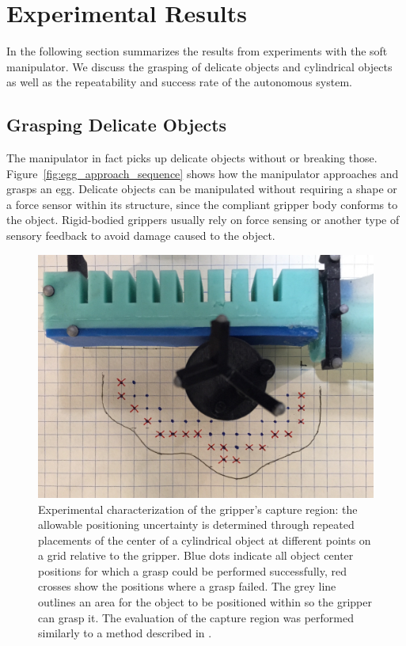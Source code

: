 \section{Experimental Results}
\label{sec:experimental_results}
In the following section summarizes the results from experiments with the soft manipulator. We discuss the grasping of delicate objects and cylindrical objects as well as the repeatability and success rate of the autonomous system.
 
\subsection{Grasping Delicate Objects}
The manipulator in fact picks up delicate objects  without  or breaking those. 
Figure~\ref{fig:egg_approach_sequence} shows  how the manipulator approaches and grasps an egg.
Delicate objects can be manipulated without requiring a shape or a force sensor within its structure, since the compliant gripper body conforms to the object.
Rigid-bodied grippers usually rely on force sensing or another type of sensory feedback to avoid damage caused to the object.

\begin{figure}[htb]
\centering
   \includegraphics[width=0.8\columnwidth]{Figures/experimental_results/uncertainty}
   \caption{Experimental characterization of the gripper's capture region: the allowable positioning uncertainty is determined through repeated placements of the center of a cylindrical object at different points on a grid relative to the gripper. Blue dots indicate all object center positions for which a grasp could be performed successfully, red crosses show the positions where a grasp failed. The grey line outlines an area for the object to be positioned within so the gripper can grasp it. The evaluation of the capture region was performed similarly to a method described in \cite{dogar2010push}.}
   \label{fig:grasp_uncertainty}
\end{figure} 

